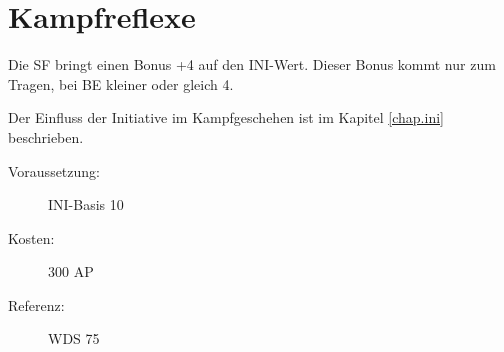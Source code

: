 \section{Kampfreflexe}
\label{sf.kampfreflexe}
Die SF  bringt einen Bonus +4 auf den INI-Wert.
Dieser Bonus kommt nur zum Tragen, bei BE kleiner oder gleich 4.

Der Einfluss der Initiative im Kampfgeschehen ist im Kapitel \ref{chap.ini} beschrieben.
\begin{description}
    \item[Voraussetzung:]
        INI-Basis 10
    \item [Kosten:]
        300 AP
    \item [Referenz:]
        WDS 75
\end{description}
